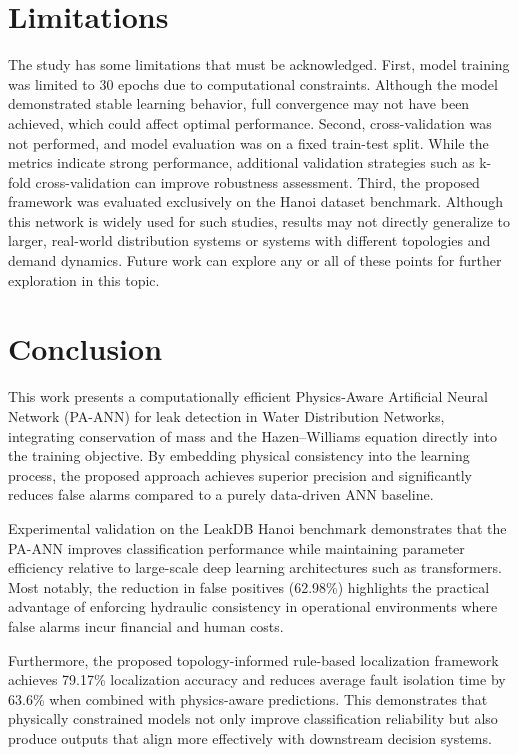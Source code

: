 \documentclass[final,5p,times,twocolumn,authoryear]{elsarticle}
\begin{document}
\section{Limitations}
The study has some limitations that must be acknowledged.
First, model training was limited to 30 epochs due to computational constraints. Although the model demonstrated stable learning behavior, full convergence may not have been achieved, which could affect optimal performance.
Second, cross-validation was not performed, and model evaluation was on a fixed train-test split. While the metrics indicate strong performance, additional validation strategies such as k-fold cross-validation can improve robustness assessment.
Third, the proposed framework was evaluated exclusively on the Hanoi dataset benchmark. Although this network is widely used for such studies, results may not directly generalize to larger, real-world distribution systems or systems with different topologies and demand dynamics.
Future work can explore any or all of these points for further exploration in this topic.

\section{Conclusion}

This work presents a computationally efficient Physics-Aware Artificial Neural Network (PA-ANN) for leak detection in Water Distribution Networks, integrating conservation of mass and the Hazen–Williams equation directly into the training objective. By embedding physical consistency into the learning process, the proposed approach achieves superior precision and significantly reduces false alarms compared to a purely data-driven ANN baseline.

Experimental validation on the LeakDB Hanoi benchmark demonstrates that the PA-ANN improves classification performance while maintaining parameter efficiency relative to large-scale deep learning architectures such as transformers. Most notably, the reduction in false positives (62.98\%) highlights the practical advantage of enforcing hydraulic consistency in operational environments where false alarms incur financial and human costs.

Furthermore, the proposed topology-informed rule-based localization framework achieves 79.17\% localization accuracy and reduces average fault isolation time by 63.6\% when combined with physics-aware predictions. This demonstrates that physically constrained models not only improve classification reliability but also produce outputs that align more effectively with downstream decision systems.
\end{document}
